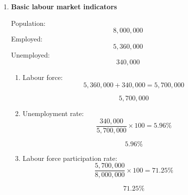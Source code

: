 \documentclass[12pt]{article}
\begin{document}
\begin{enumerate}
\begin{enumerate}[label=(\alph*)]
    \item Annual advantage:
    \[
    \boxed{\$6{,}000}
    \]

    \item Present value:

    \[
    PV=6000\left(\frac{1-(1.04)^{-25}}{0.04}\right)
    \]

    Since
    \[
    (1.04)^{-25}\approx 0.3751
    \]
    then
    \[
    \frac{1-0.3751}{0.04}=15.6225
    \]
    so
    \[
    PV=6000(15.6225)=93{,}735
    \]

    \[
    \boxed{\$93{,}735}
    \]

    \item Subtract moving cost:
    \[
    93{,}735-20{,}000=73{,}735
    \]

    Since this is positive, the migrant should move.

    \[
    \boxed{\text{Yes, the migrant should move}}
    \]
\end{enumerate}

\section*{Part IX: Unemployment Measurement and Dynamics}

\item \textbf{Basic labour market indicators}

Population:
\[
8{,}000{,}000
\]
Employed:
\[
5{,}360{,}000
\]
Unemployed:
\[
340{,}000
\]

\begin{enumerate}[label=(\alph*)]
    \item Labour force:
    \[
    5{,}360{,}000+340{,}000=5{,}700{,}000
    \]

    \[
    \boxed{5{,}700{,}000}
    \]

    \item Unemployment rate:
    \[
    \frac{340{,}000}{5{,}700{,}000}\times 100=5.96\%
    \]

    \[
    \boxed{5.96\%}
    \]

    \item Labour force participation rate:
    \[
    \frac{5{,}700{,}000}{8{,}000{,}000}\times 100=71.25\%
    \]

    \[
    \boxed{71.25\%}
    \]


\end{enumerate}
\end{enumerate}
\end{document}
